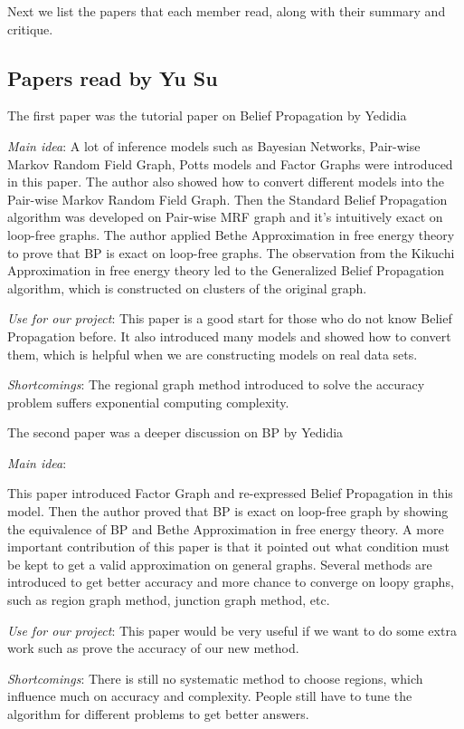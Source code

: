 Next we list the papers that each member read,
along with their summary and critique.

\subsection{Papers read by Yu Su}
The first paper was the tutorial paper on Belief Propagation by Yedidia
\cite{Yedidia:2003:UBP}
\begin{itemize*}
\item {\em Main idea}:
A lot of inference models such as Bayesian Networks, Pair-wise Markov Random Field Graph, Potts models and Factor Graphs were introduced in this paper.
The author also showed how to convert different models into the Pair-wise Markov Random Field Graph.
Then the Standard Belief Propagation algorithm was developed on Pair-wise MRF graph and it's intuitively exact on loop-free graphs.
The author applied Bethe Approximation in free energy theory to prove that BP is exact on loop-free graphs.
The observation from the Kikuchi Approximation in free energy theory led to the Generalized Belief Propagation algorithm, which is constructed on clusters of the original graph.

\item {\em Use for our project}:
This paper is a good start for those who do not know Belief Propagation before. It also introduced many models and showed how to convert them, which is helpful when we are constructing models on real data sets.

\item {\em Shortcomings}:
The regional graph method introduced to solve the accuracy problem suffers exponential computing complexity.

\end{itemize*}


The second paper was a deeper discussion on BP by Yedidia
\cite{Yedidia05constructingfree}
\begin{itemize*}
\item {\em Main idea}:

This paper introduced Factor Graph and re-expressed Belief Propagation in this model.
Then the author proved that BP is exact on loop-free graph by showing the equivalence of BP and Bethe Approximation in free energy theory.
A more important contribution of this paper is that it pointed out what condition must be kept to get a valid approximation on general graphs.
Several methods are introduced to get better accuracy and more chance to converge on loopy graphs, such as region graph method, junction graph method, etc.

\item {\em Use for our project}:
This paper would be very useful if we want to do some extra work such as prove the accuracy of our new method.

\item {\em Shortcomings}:
There is still no systematic method to choose regions, which influence much on accuracy and complexity. People still have to tune the algorithm for different problems to get better answers.

\end{itemize*}


